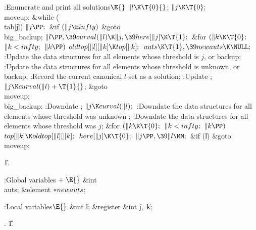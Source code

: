 \Y\B\4:Enumerate and print all solutions\X${}\E{}$\6
$\|l\K\T{0}{}$;\5
${}\|j\K\T{0};{}$\6
\4\\{moveup}:\5
\&{while} (\\{tab}[\|j])\1\5
${}\|j\PP;{}$\2\6
\&{if} ${}(\|j\E\\{infty}){}$\1\5
\&{goto} \\{big\_backup};\2\6
${}\|l\PP,\39\\{curval}(\|l)\K\|j,\39\\{here}[\|j]\K\T{1};{}$\6
\&{for} ${}(\|k\K\T{0};{}$ ${}\|k<\\{infty};{}$ ${}\|k\PP){}$\1\5
${}\\{oldtop}[\|l][\|k]\K\\{top}[\|k];{}$\2\6
${}\\{auts}\K\T{1},\39\\{newauts}\K\NULL;{}$\6
:Update the data structures for all elements whose threshold is $j$, or
backup\X;\6
:Update the data structures for all elements whose threshold is unknown, or
backup\X;\6
:Record the current canonical $l$-set as a solution\X;\6
:Update \X;\6
${}\|j\K\\{curval}(\|l)+\T{1}{}$;\5
\&{goto} \\{moveup};\6
\4\\{big\_backup}:\5
:Downdate \X;\6
${}\|j\K\\{curval}(\|l);{}$\6
:Downdate the data structures for all elements whose threshold was unknown%
\X;\6
:Downdate the data structures for all elements whose threshold was $j$\X;\6
\&{for} ${}(\|k\K\T{0};{}$ ${}\|k<\\{infty};{}$ ${}\|k\PP){}$\1\5
${}\\{top}[\|k]\K\\{oldtop}[\|l][\|k];{}$\2\6
${}\\{here}[\|j]\K\T{0};{}$\6
${}\|j\PP,\39\|l\MM;{}$\6
\&{if} (\|l)\1\5
\&{goto} \\{moveup};\2\par
\U1.\fi

\B{}:Global variables\X${}\mathrel+\E{}$\6
\&{int} \\{auts};\6
\&{element} ${}{*}\\{newauts}{}$;\par
\fi

\B{}:Local variables\X${}\E{}$\6
\&{int} \|l;\6
\&{register} \&{int} \|j${},{}$ \|k;\par
{}.
\U1.\fi

